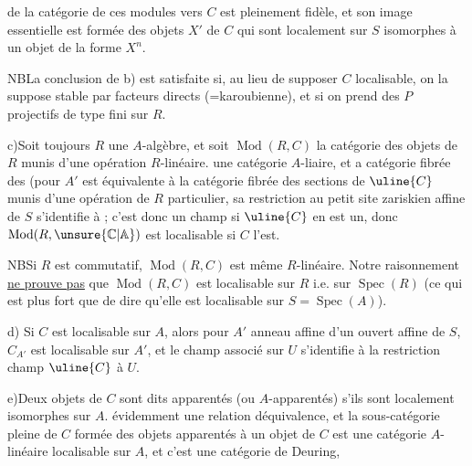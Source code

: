 de la catégorie de ces modules vers $C$ est pleinement fidèle, et son image essentielle est formée des objets $X'$ de $C$ qui sont localement sur $S$ isomorphes à un objet de la forme $X^n$.

NB\quad La conclusion de b) est satisfaite si, au lieu de supposer $C$ localisable, on la suppose stable par facteurs directs (=karoubienne), et  si on prend des $P$ projectifs de type fini sur $R$.

c)\quad Soit toujours $R$ une $A$-algèbre,  et soit $\operatorname{Mod}(R,C)$ la catégorie des objets de $R$ munis d'une opération $R$-linéaire.  une catégorie $A$-liaire, et a catégorie fibrée des
(pour $A'$   est équivalente à la catégorie fibrée des sections de $\uline{C}$ munis d'une opération de $R$  particulier, sa restriction au  petit site zariskien affine de $S$  s'identifie à
; c'est donc un champ si $\uline{C}$ en est un, donc $\operatorname{Mod}(R,\unsure{\mathbb{C}|\mathbb{A}})$ est localisable  si $C$ l'est.

NB\quad Si $R$ est commutatif, $\operatorname{Mod}(R,C)$ est même $R$-linéaire. Notre raisonnement \uline{ne prouve pas} que  $\operatorname{Mod}(R,C)$ est localisable sur $R$ i.e. sur $\operatorname{Spec}(R)$ (ce qui est plus fort que de dire qu'elle est localisable sur $S=\operatorname{Spec}(A)$).

d)\quad {} Si $C$ est localisable sur $A$, alors pour $A'$  anneau affine d'un ouvert affine  de $S$, $C_{A'}$ est localisable sur $A'$, et le champ associé sur $U$ s'identifie à la restriction  champ $\uline{C}$ à $U$.

e)\quad Deux objets de $C$ sont dits apparentés (ou $A$-apparentés) s'ils sont localement isomorphes sur $A$.  évidemment une relation déquivalence, et la sous-catégorie pleine de $C$ formée des objets apparentés à un objet de $C$ est une catégorie  $A$-linéaire localisable sur $A$, et c'est une catégorie de Deuring,
